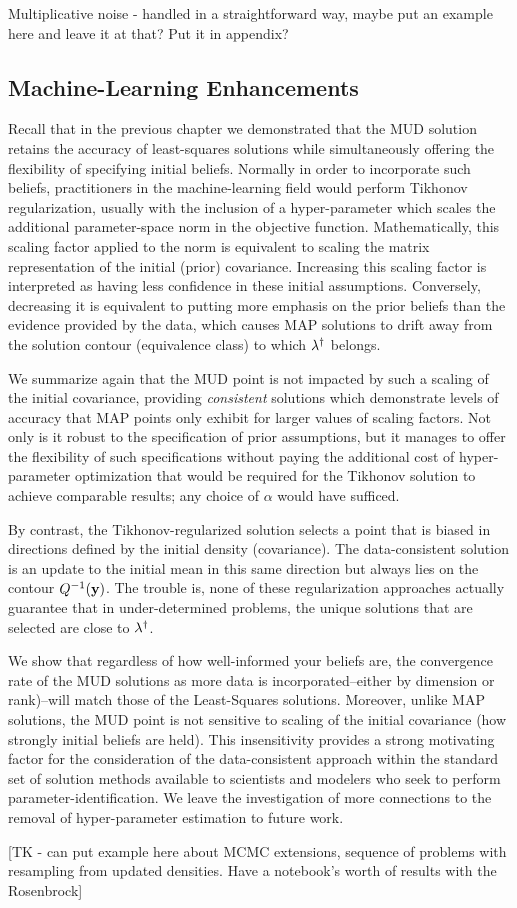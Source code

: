 Multiplicative noise - handled in a straightforward way, maybe put an example here and leave it at that? Put it in appendix?


\subsection{Machine-Learning Enhancements}\label{sec:ch05-ml}

Recall that in the previous chapter we demonstrated that the MUD solution retains the accuracy of least-squares solutions while simultaneously offering the flexibility of specifying initial beliefs.
Normally in order to incorporate such beliefs, practitioners in the machine-learning field would perform Tikhonov regularization, usually with the inclusion of a hyper-parameter which scales the additional parameter-space norm in the objective function.
Mathematically, this scaling factor applied to the norm is equivalent to scaling the matrix representation of the initial (prior) covariance.
Increasing this scaling factor is interpreted as having less confidence in these initial assumptions.
Conversely, decreasing it is equivalent to putting more emphasis on the prior beliefs than the evidence provided by the data, which causes MAP solutions to drift away from the solution contour (equivalence class) to which $\lambda^\dagger$ belongs.

We summarize again that the MUD point is not impacted by such a scaling of the initial covariance, providing \emph{consistent} solutions which demonstrate levels of accuracy that MAP points only exhibit for larger values of scaling factors.
Not only is it robust to the specification of prior assumptions, but it manages to offer the flexibility of such specifications without paying the additional cost of hyper-parameter optimization that would be required for the Tikhonov solution to achieve comparable results; any choice of $\alpha$ would have sufficed.

By contrast, the Tikhonov-regularized solution selects a point that is biased in directions defined by the initial density (covariance).
The data-consistent solution is an update to the initial mean in this same direction but always lies on the contour $Q^{-1}(\mathbf{y})$.
The trouble is, none of these regularization approaches actually guarantee that in under-determined problems, the unique solutions that are selected are close to $\lambda^\dagger$.

We show that regardless of how well-informed your beliefs are, the convergence rate of the MUD solutions as more data is incorporated\---either by dimension or rank)\---will match those of the Least-Squares solutions.
Moreover, unlike MAP solutions, the MUD point is not sensitive to scaling of the initial covariance (how strongly initial beliefs are held).
This insensitivity provides a strong motivating factor for the consideration of the data-consistent approach within the standard set of solution methods available to scientists and modelers who seek to perform parameter-identification.
We leave the investigation of more connections to the removal of hyper-parameter estimation to future work.

[TK - can put example here about MCMC extensions, sequence of problems with resampling from updated densities. Have a notebook's worth of results with the Rosenbrock]


\FloatBarrier
